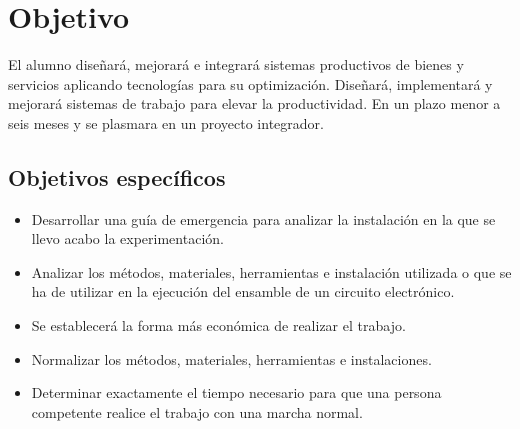     \section{Objetivo}

% 
% 
% 
%
El alumno diseñará, mejorará e integrará sistemas productivos de bienes y servicios aplicando tecnologías para su optimización.
Diseñará, implementará y mejorará sistemas de trabajo para elevar la productividad.
En un plazo menor a seis meses y se plasmara en un proyecto integrador.
%
%
    \subsection{Objetivos específicos }


% 
%
\begin{itemize}
    \item Desarrollar una guía de emergencia para analizar la instalación en la que se llevo acabo la experimentación.
    \item Analizar los métodos, materiales, herramientas e instalación utilizada o que se ha de utilizar en la ejecución del ensamble de un circuito electrónico.
    \item Se establecerá la forma más económica de realizar el trabajo.
    \item Normalizar los métodos, materiales, herramientas e instalaciones.
    \item Determinar exactamente el tiempo necesario para que una persona competente realice el trabajo con una marcha normal.
\end{itemize} 
